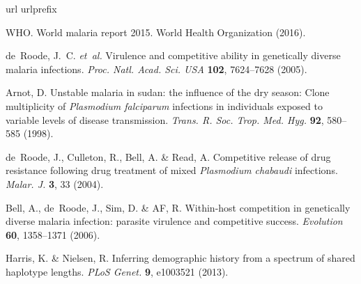 \documentclass{nature}
\begin{document}
\begin{thebibliography}{10}
\expandafter\ifx\csname url\endcsname\relax
  \def\url#1{\texttt{#1}}\fi
\expandafter\ifx\csname urlprefix\endcsname\relax\def\urlprefix{URL }\fi
\providecommand{\bibinfo}[2]{#2}
\providecommand{\eprint}[2][]{\url{#2}}

\bibinfo{author}{WHO}.
\newblock \bibinfo{title}{World malaria report 2015}.
\newblock \bibinfo{howpublished}{World Health Organization}
  (\bibinfo{year}{2016}).

\bibinfo{author}{de~Roode, J.~C.} \emph{et~al.}
\newblock \bibinfo{title}{Virulence and competitive ability in genetically
  diverse malaria infections}.
\newblock \emph{\bibinfo{journal}{Proc. Natl. Acad. Sci. USA}}
  \textbf{\bibinfo{volume}{102}}, \bibinfo{pages}{7624--7628}
  (\bibinfo{year}{2005}).

\bibinfo{author}{Arnot, D.}
\newblock \bibinfo{title}{Unstable malaria in sudan: the influence of the dry
  season: Clone multiplicity of {{\em {P}lasmodium falciparum}} infections in
  individuals exposed to variable levels of disease transmission}.
\newblock \emph{\bibinfo{journal}{Trans. R. Soc. Trop. Med. Hyg.}}
  \textbf{\bibinfo{volume}{92}}, \bibinfo{pages}{580--585}
  (\bibinfo{year}{1998}).

\bibinfo{author}{de~Roode, J.}, \bibinfo{author}{Culleton, R.},
  \bibinfo{author}{Bell, A.} \& \bibinfo{author}{Read, A.}
\newblock \bibinfo{title}{Competitive release of drug resistance following drug
  treatment of mixed {{\em {P}lasmodium chabaudi}} infections}.
\newblock \emph{\bibinfo{journal}{Malar. J.}} \textbf{\bibinfo{volume}{3}},
  \bibinfo{pages}{33} (\bibinfo{year}{2004}).

\bibinfo{author}{Bell, A.}, \bibinfo{author}{de~Roode, J.},
  \bibinfo{author}{Sim, D.} \& \bibinfo{author}{AF, R.}
\newblock \bibinfo{title}{Within-host competition in genetically diverse
  malaria infection: parasite virulence and competitive success.}
\newblock \emph{\bibinfo{journal}{Evolution}} \textbf{\bibinfo{volume}{60}},
  \bibinfo{pages}{1358--1371} (\bibinfo{year}{2006}).

\bibinfo{author}{Harris, K.} \& \bibinfo{author}{Nielsen, R.}
\newblock \bibinfo{title}{Inferring demographic history from a spectrum of
  shared haplotype lengths}.
\newblock \emph{\bibinfo{journal}{PLoS Genet.}} \textbf{\bibinfo{volume}{9}},
  \bibinfo{pages}{e1003521} (\bibinfo{year}{2013}).


\end{thebibliography}
\end{document}
